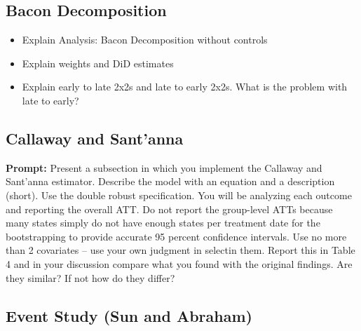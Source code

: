 \documentclass{article}
\begin{document}
\newpage

\subsection{Bacon Decomposition}

\begin{itemize}
\item
Explain Analysis: Bacon Decomposition without controls
\item
Explain weights and DiD estimates
\item
Explain early to late 2x2s and late to early 2x2s. What is the problem with late to early?
\end{itemize}



















\subsection{Callaway and Sant'anna}

\textbf{Prompt: } Present a subsection in which you implement the Callaway and Sant’anna estimator.  Describe the model with an equation and a description (short). Use the double robust specification. You will be analyzing each outcome and reporting the overall ATT.  Do not report the group-level ATTs because many states simply do not have enough states per treatment date for the bootstrapping to provide accurate 95 percent confidence intervals.  Use no more than 2 covariates – use your own judgment in selectin them. Report this in Table 4 and in your discussion compare what you found with the original findings.  Are they similar?  If not how do they differ?

\subsection{Event Study (Sun and Abraham)}
\end{document}
